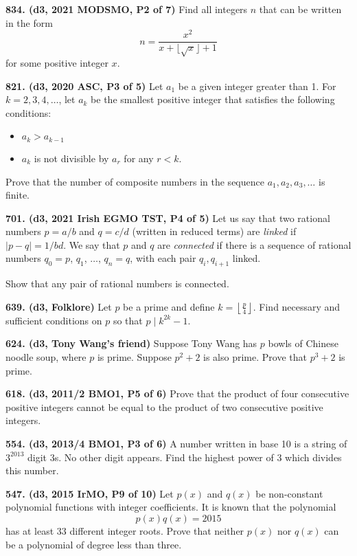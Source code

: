 \documentclass{article}
\begin{document}
\textbf{834. (\color{red}d3\color{black}, 2021 MODSMO, P2 of 7)} Find all integers $n$ that can be written in the form $$ n = \frac{x^{2}}{x+\lfloor\sqrt{x}\rfloor+1} $$ for some positive integer $x$.

\textbf{821. (\color{red}d3\color{black}, 2020 ASC, P3 of 5)} Let $a_{1}$ be a given integer greater than 1. For $k=2,3,4, \ldots$, let $a_{k}$ be the smallest positive integer that satisfies the following conditions:
\begin{itemize}
    \item $a_{k}>a_{k-1}$
    \item $a_{k}$ is not divisible by $a_{r}$ for any $r<k$.
\end{itemize}
Prove that the number of composite numbers in the sequence $a_{1}, a_{2}, a_{3}, \ldots$ is finite.

\textbf{701. (\color{red}d3\color{black}, 2021 Irish EGMO TST, P4 of 5)} Let us say that two rational numbers $p=a/b$ and $q=c/d$ (written in reduced terms) are \emph{linked} if $|p-q|=1/b d$. We say that $p$ and $q$ are \emph{connected} if there is a sequence of rational numbers $q_{0}=p$, $q_{1}$, $\ldots$, $q_{n}=q$, with each pair $q_{i}, q_{i+1}$ linked.

Show that any pair of rational numbers is connected.

\textbf{639. (\color{red}d3\color{black}, Folklore)} Let $p$ be a prime and define $k = \left\lfloor \frac{p}{4}\right\rfloor$. Find necessary and sufficient conditions on $p$ so that $p \mid k^{2k} - 1$.

\textbf{624. (\color{red}d3\color{black}, Tony Wang's friend)} Suppose Tony Wang has $p$ bowls of Chinese noodle soup, where $p$ is prime. Suppose $p^2+2$ is also prime. Prove that $p^3+2$ is prime.

\textbf{618. (\color{red}d3\color{black}, 2011/2 BMO1, P5 of 6)} Prove that the product of four consecutive positive integers cannot be equal to the product of two consecutive positive integers.

\textbf{554. (\color{red}d3\color{black}, 2013/4 BMO1, P3 of 6)} A number written in base 10 is a string of $3^{2013}$ digit $3$s. No other digit appears. Find the highest power of 3 which divides this number.

\textbf{547. (\color{red}d3\color{black}, 2015 IrMO, P9 of 10)} Let $p(x)$ and $q(x)$ be non-constant polynomial functions with integer coefficients. It is known that the polynomial $$p(x)q(x) = 2015$$
has at least $33$ different integer roots. Prove that neither $p(x)$ nor $q(x)$ can be a polynomial of degree less than three.
\end{document}
